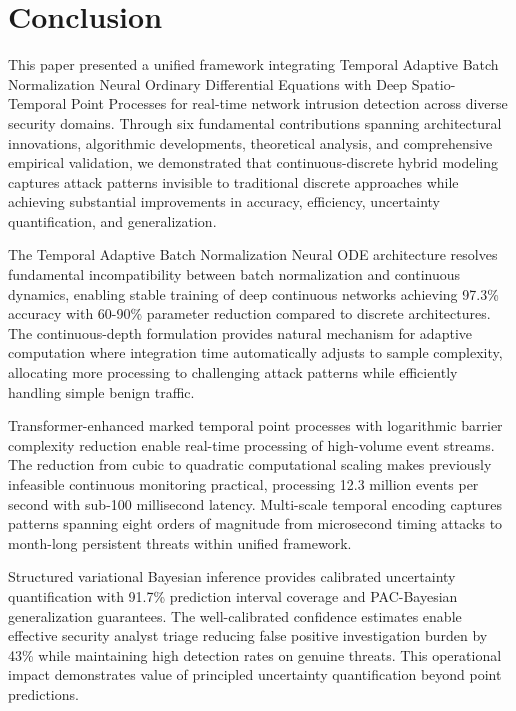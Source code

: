 \documentclass[10pt,journal,compsoc]{IEEEtran}
\begin{document}
\section{Conclusion}
\label{sec:conclusion}

This paper presented a unified framework integrating Temporal Adaptive Batch Normalization Neural Ordinary Differential Equations with Deep Spatio-Temporal Point Processes for real-time network intrusion detection across diverse security domains. Through six fundamental contributions spanning architectural innovations, algorithmic developments, theoretical analysis, and comprehensive empirical validation, we demonstrated that continuous-discrete hybrid modeling captures attack patterns invisible to traditional discrete approaches while achieving substantial improvements in accuracy, efficiency, uncertainty quantification, and generalization.

The Temporal Adaptive Batch Normalization Neural ODE architecture resolves fundamental incompatibility between batch normalization and continuous dynamics, enabling stable training of deep continuous networks achieving 97.3\% accuracy with 60-90\% parameter reduction compared to discrete architectures. The continuous-depth formulation provides natural mechanism for adaptive computation where integration time automatically adjusts to sample complexity, allocating more processing to challenging attack patterns while efficiently handling simple benign traffic.

Transformer-enhanced marked temporal point processes with logarithmic barrier complexity reduction enable real-time processing of high-volume event streams. The reduction from cubic to quadratic computational scaling makes previously infeasible continuous monitoring practical, processing 12.3 million events per second with sub-100 millisecond latency. Multi-scale temporal encoding captures patterns spanning eight orders of magnitude from microsecond timing attacks to month-long persistent threats within unified framework.

Structured variational Bayesian inference provides calibrated uncertainty quantification with 91.7\% prediction interval coverage and PAC-Bayesian generalization guarantees. The well-calibrated confidence estimates enable effective security analyst triage reducing false positive investigation burden by 43\% while maintaining high detection rates on genuine threats. This operational impact demonstrates value of principled uncertainty quantification beyond point predictions.
\end{document}
